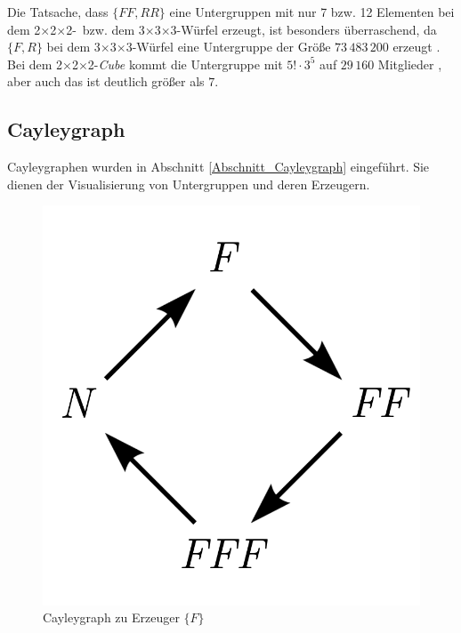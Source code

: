 \documentclass[12pt,a4paper, usenames, dvipsnames]{article}
\theoremstyle{mystyle}
\theoremstyle{definition}
\newcommand{\Ttwo}{2$\times$2$\times$2-}
\newcommand{\Tthree}{3$\times$3$\times$3-}
\begin{document}
Die Tatsache, dass $\{ FF, RR \}$ eine Untergruppen mit nur 7 bzw. 12 Elementen bei dem \Ttwo \  bzw. dem \Tthree Würfel erzeugt, ist besonders überraschend, da $\{ F, R \}$ bei dem  \Tthree Würfel eine Untergruppe der Größe $73\, 483\, 200$ erzeugt \cite{TD}. 
Bei dem \Ttwo \textit{Cube} kommt die Untergruppe mit $5! \cdot 3^5$ auf $29 \, 160$ Mitglieder \cite{TD}, aber auch das ist deutlich größer als $7$.

%
%
%
%
%
%
%
%
%
%
%
%
%
%
%
%

\subsection{Cayleygraph}

Cayleygraphen wurden in Abschnitt \ref{Abschnitt_Cayleygraph} eingeführt. Sie dienen der Visualisierung von Untergruppen und deren Erzeugern.

\begin{figure}[H]
\centering
\includegraphics[scale=0.6]{Cayleygraph1.png}
\caption{Cayleygraph zu Erzeuger $\{ F \}$}
\label{Abbildung_CayleygraphF}
\end{figure}
\end{document}
